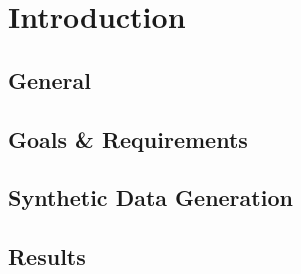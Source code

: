 \chapter{Introduction}
\section{General}
\lipsum[3-4]
\section{Goals \& Requirements}
\lipsum[9-11]
\section{Synthetic Data Generation}
\lipsum[8-10]
\section{Results}
\lipsum[5-6]